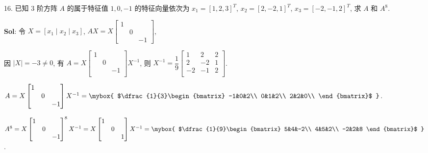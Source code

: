 
16. 已知 3 阶方阵 $A$ 的属于特征值 $1,0,-1$ 的特征向量依次为 $x_1=[1,2,3]^T$, 
$x_2=[2,-2,1]^T$, $x_3=[-2,-1,2]^T$, 求 $A$ 和 $A^8$.

\textbf{Sol}: 令 $X=[x_1 \mid x_2 \mid x_3]$, $AX=X\begin{bmatrix}
    1&&\\
    &0&\\
    &&-1
\end{bmatrix}$,

因 $|X|=-3\not=0$, 有 $A=X\begin{bmatrix}
    1&&\\
    &0&\\
    &&-1\\
\end{bmatrix}X^{-1}$, 则 $X^{-1}=\dfrac{1}{9}\begin{bmatrix}
    1&2&2\\
    2&-2&1\\
    -2&-1&2\\
\end{bmatrix}$.

$A=X\begin{bmatrix}
    1&&\\
    &0&\\
    &&-1\\
\end{bmatrix}X^{-1}
=\mybox{
$\dfrac{1}{3}\begin{bmatrix}
    -1&0&2\\
    0&1&2\\
    2&2&0\\
\end{bmatrix}$
}$.

$A^8=X\begin{bmatrix}
    1&&\\
    &0&\\
    &&-1\\
\end{bmatrix}^8X^{-1}=X\begin{bmatrix}
    1&&\\
    &0&\\
    &&1\\
\end{bmatrix}X^{-1}
=\mybox{
$\dfrac{1}{9}\begin{bmatrix}
    5&4&-2\\
    4&5&2\\
    -2&2&8
\end{bmatrix}$
}$.


\vspace{12pt}

